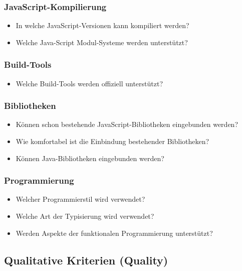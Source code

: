 \subsubsection{JavaScript-Kompilierung}
\begin{itemize}
	\item In welche JavaScript-Versionen kann kompiliert werden?
	\item Welche Java-Script Modul-Systeme werden unterstützt?
\end{itemize}

\subsubsection{Build-Tools}
\begin{itemize}
	\item Welche Build-Tools werden offiziell unterstützt?
\end{itemize}

\subsubsection{Bibliotheken}
\begin{itemize}
	\item Können schon bestehende JavaScript-Bibliotheken eingebunden werden?
	\item Wie komfortabel ist die Einbindung bestehender Bibliotheken?
	\item Können Java-Bibliotheken eingebunden werden?
\end{itemize}

\subsubsection{Programmierung}
\begin{itemize}
	\item Welcher Programmierstil wird verwendet?
	\item Welche Art der Typisierung wird verwendet?
	\item Werden Aspekte der funktionalen Programmierung unterstützt?
\end{itemize}

\subsection{Qualitative Kriterien (Quality)}\label{sec:qualityCriteria}
